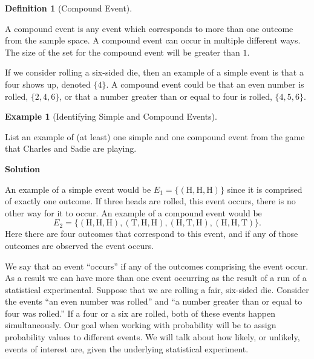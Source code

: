 \documentclass[
  letterpaper,
  DIV=11,
  numbers=noendperiod]{scrreprt}
\theoremstyle{definition}
\theoremstyle{definition}
\newtheorem{example}{Example}[chapter]
\theoremstyle{definition}
\newtheorem{definition}{Definition}[chapter]
\theoremstyle{remark}
\begin{document}
\begin{definition}[Compound
Event]\protect\hypertarget{def-compound-event}{}\label{def-compound-event}

A compound event is any event which corresponds to more than one outcome
from the sample space. A compound event can occur in multiple different
ways. The size of the set for the compound event will be greater than
\(1\).

\end{definition}

If we consider rolling a six-sided die, then an example of a simple
event is that a four shows up, denoted \(\{4\}\). A compound event could
be that an even number is rolled, \(\{2,4,6\}\), or that a number
greater than or equal to four is rolled, \(\{4, 5, 6\}\).

\begin{example}[Identifying Simple and Compound
Events]\protect\hypertarget{exm-simple-versus-compound}{}\label{exm-simple-versus-compound}

List an example of (at least) one simple and one compound event from the
game that Charles and Sadie are playing.

\begin{tcolorbox}[enhanced jigsaw, colback=white, colframe=quarto-callout-color-frame, arc=.35mm, leftrule=.75mm, rightrule=.15mm, opacityback=0, breakable, bottomrule=.15mm, left=2mm, toprule=.15mm]

\vspace{-3mm}\textbf{Solution}\vspace{3mm}

An example of a simple event would be
\(E_1 = \{(\text{H},\text{H},\text{H})\}\) since it is comprised of
exactly one outcome. If three heads are rolled, this event occurs, there
is no other way for it to occur. An example of a compound event would be
\[E_2 = \{(\text{H},\text{H},\text{H}), (\text{T},\text{H},\text{H}), (\text{H},\text{T},\text{H}), (\text{H},\text{H},\text{T})\}.\]
Here there are four outcomes that correspond to this event, and if any
of those outcomes are observed the event occurs.

\end{tcolorbox}

\end{example}

We say that an event ``occurs'' if any of the outcomes comprising the
event occur. As a result we can have more than one event occurring as
the result of a run of a statistical experimental. Suppose that we are
rolling a fair, six-sided die. Consider the events ``an even number was
rolled'' and ``a number greater than or equal to four was rolled.'' If a
four or a six are rolled, both of these events happen simultaneously.
Our goal when working with probability will be to assign probability
values to different events. We will talk about how likely, or unlikely,
events of interest are, given the underlying statistical experiment.
\end{document}
